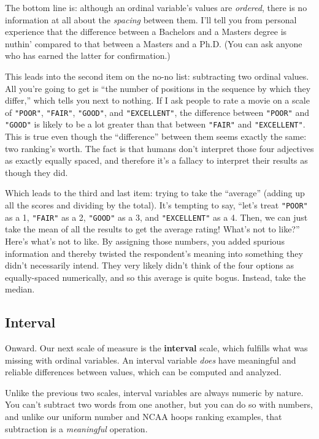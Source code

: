 The bottom line is: although an ordinal variable's values are \textit{ordered},
there is no information at all about the \textit{spacing} between them. I'll
tell you from personal experience that the difference between a Bachelors and a
Masters degree is nuthin' compared to that between a Masters and a Ph.D. (You
can ask anyone who has earned the latter for confirmation.)

This leads into the second item on the no-no list: subtracting two ordinal
values. All you're going to get is ``the number of positions in the sequence by
which they differ,'' which tells you next to nothing. If I ask people to rate a
movie on a scale of \texttt{"POOR"}, \texttt{"FAIR"}, \texttt{"GOOD"}, and
\texttt{"EXCELLENT"}, the difference between \texttt{"POOR"} and
\texttt{"GOOD"} is likely to be a lot greater than that between \texttt{"FAIR"}
and \texttt{"EXCELLENT"}. This is true even though the ``difference'' between
them seems exactly the same: two ranking's worth. The fact is that humans
don't interpret those four adjectives as exactly equally spaced, and therefore
it's a fallacy to interpret their results as though they did.

Which leads to the third and last item: trying to take the ``average'' (adding
up all the scores and dividing by the total). It's tempting to say, ``let's
treat \texttt{"POOR"} as a 1, \texttt{"FAIR"} as a 2, \texttt{"GOOD"} as a 3,
and \texttt{"EXCELLENT"} as a 4. Then, we can just take the mean of all the
results to get the average rating! What's not to like?'' Here's what's not to
like. By assigning those numbers, you added spurious information and thereby
twisted the respondent's meaning into something they didn't necessarily intend.
They very likely didn't think of the four options as equally-spaced
numerically, and so this average is quite bogus. Instead, take the median.


\subsection{Interval}

Onward. Our next scale of measure is the \textbf{interval} scale, which
fulfills what was missing with ordinal variables. An interval variable
\textit{does} have meaningful and reliable differences between values, which
can be computed and analyzed.

Unlike the previous two scales, interval variables are always numeric by
nature. You can't subtract two words from one another, but you can do so with
numbers, and unlike our uniform number and NCAA hoops ranking examples, that
subtraction is a \textit{meaningful} operation.

